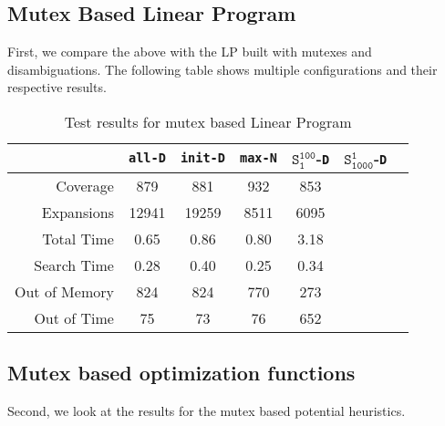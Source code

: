 \subsection{Mutex Based Linear Program}\label{subsec:mutex-based-linear-program}
First, we compare the above with the LP built with mutexes and disambiguations.
The following table shows multiple configurations and their respective results.
\begin{table}[h!]
    \begin{center}
        \begin{tabular}{|r|c|c|c|c|c|c|}
            \hline
            & \textbf{\texttt{all-D}} & \textbf{\texttt{init-D}} & \textbf{\texttt{max-N}} & \textbf{$\texttt{S}_\texttt{1}^\texttt{100}$-\texttt{D}}& \textbf{$\texttt{S}_\texttt{1000}^\texttt{1}$-\texttt{D}}\\
            \hline \hline
            Coverage & 879 & 881 & 932 & 853 & \\ \hline
            Expansions & 12941 & 19259 & 8511 & 6095 & \\ \hline
            Total Time & 0.65 & 0.86 & 0.80 & 3.18 & \\ \hline
            Search Time & 0.28 & 0.40 & 0.25 & 0.34 & \\ \hline
            Out of Memory & 824 & 824 & 770 & 273 & \\ \hline
            Out of Time & 75 & 73 & 76 & 652 & \\ \hline
        \end{tabular}
        \caption{Test results for mutex based Linear Program}
        \label{table:mutex_lp}
    \end{center}
\end{table}


\subsection{Mutex based optimization functions}\label{subsec:mutex-based-optimization-functions}
Second, we look at the results for the mutex based potential heuristics.

